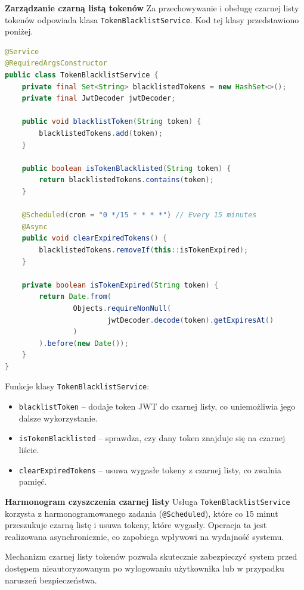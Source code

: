 \noindent \textbf{Zarządzanie czarną listą tokenów}\newline
Za przechowywanie i obsługę czarnej listy tokenów odpowiada klasa \texttt{TokenBlacklistService}. Kod tej klasy przedstawiono poniżej.

\begin{lstlisting}[language=Java, style=JavaStyle, caption=Klasa \texttt{TokenBlacklistService}]
@Service
@RequiredArgsConstructor
public class TokenBlacklistService {
    private final Set<String> blacklistedTokens = new HashSet<>();
    private final JwtDecoder jwtDecoder;

    public void blacklistToken(String token) {
        blacklistedTokens.add(token);
    }

    public boolean isTokenBlacklisted(String token) {
        return blacklistedTokens.contains(token);
    }

    @Scheduled(cron = "0 */15 * * * *") // Every 15 minutes
    @Async
    public void clearExpiredTokens() {
        blacklistedTokens.removeIf(this::isTokenExpired);
    }

    private boolean isTokenExpired(String token) {
        return Date.from(
                Objects.requireNonNull(
                        jwtDecoder.decode(token).getExpiresAt()
                )
        ).before(new Date());
    }
}
\end{lstlisting}

\noindent Funkcje klasy \texttt{TokenBlacklistService}:
\begin{itemize}
    \item \texttt{blacklistToken} -- dodaje token JWT do czarnej listy, co uniemożliwia jego dalsze wykorzystanie.
    \item \texttt{isTokenBlacklisted} -- sprawdza, czy dany token znajduje się na czarnej liście.
    \item \texttt{clearExpiredTokens} -- usuwa wygasłe tokeny z czarnej listy, co zwalnia pamięć.
\end{itemize}

\noindent \textbf{Harmonogram czyszczenia czarnej listy}\newline
Usługa \texttt{TokenBlacklistService} korzysta z harmonogramowanego zadania (\texttt{@Scheduled}), które co 15 minut przeszukuje czarną listę i usuwa tokeny, które wygasły. Operacja ta jest realizowana asynchronicznie, co zapobiega wpływowi na wydajność systemu.

Mechanizm czarnej listy tokenów pozwala skutecznie zabezpieczyć system przed dostępem nieautoryzowanym po wylogowaniu użytkownika lub w przypadku naruszeń bezpieczeństwa.


